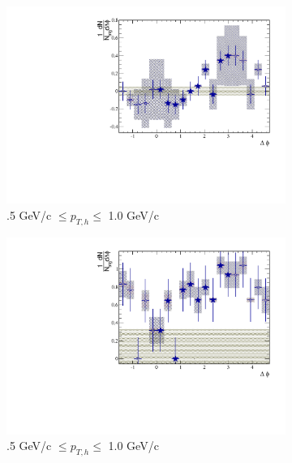 \begin{figure}[htbp]
	\begin{subfigure}{0.5\textwidth}
		\includegraphics[width=\textwidth]{Plots/Correlations/subtracted/NPE_eh_corr_subtracted_primpt_4_5_cent_4_6_assopt_1_1.pdf}
		\caption{.5 GeV/c $\leq p_{T,h} \leq$ 1.0 GeV/c}
		\label{fig:Sub2040a}
	\end{subfigure}	
	\begin{subfigure}{0.5\textwidth}
		\includegraphics[width=\textwidth]{Plots/Correlations/subtracted/NPE_eh_corr_subtracted_primpt_6_8_cent_4_6_assopt_1_1.pdf}
		\caption{.5 GeV/c $\leq p_{T,h} \leq$ 1.0 GeV/c}
		\label{fig:Sub2040b}
	\end{subfigure}	
	\begin{subfigure}{0.5\textwidth}

\end{subfigure}
\end{figure}
